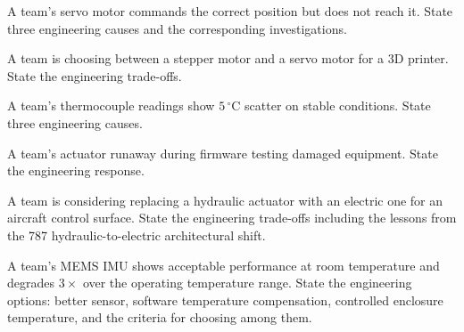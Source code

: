 \begin{exercise}
A team's servo motor commands the correct position but does not reach it. State three engineering causes and the corresponding investigations.
\end{exercise}

\begin{exercise}
A team is choosing between a stepper motor and a servo motor for a $3$D printer. State the engineering trade-offs.
\end{exercise}

\begin{exercise}
A team's thermocouple readings show $5\,^\circ\text{C}$ scatter on stable conditions. State three engineering causes.
\end{exercise}

\begin{exercise}
A team's actuator runaway during firmware testing damaged equipment. State the engineering response.
\end{exercise}

\begin{exercise}
A team is considering replacing a hydraulic actuator with an electric one for an aircraft control surface. State the engineering trade-offs including the lessons from the 787 hydraulic-to-electric architectural shift.
\end{exercise}

\begin{exercise}
A team's MEMS IMU shows acceptable performance at room temperature and degrades $3\times$ over the operating temperature range. State the engineering options: better sensor, software temperature compensation, controlled enclosure temperature, and the criteria for choosing among them.
\end{exercise}
